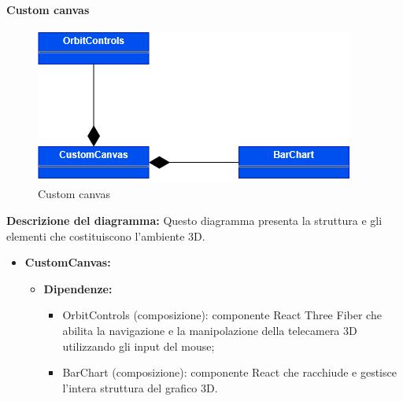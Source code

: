 \pagebreak

\paragraph{Custom canvas}
\begin{figure}[h!] \centering
    \includegraphics[scale=0.45]{template/images/uml_front/ui/customcanvas.png}
    \caption{Custom canvas}
\end{figure}
\textbf{Descrizione del diagramma:}
Questo diagramma presenta la struttura e gli elementi che costituiscono l'ambiente 3D.
\begin{itemize}
    \item \textbf{CustomCanvas:}
    \begin{itemize}
        \item \textbf{Dipendenze:}
        \begin{itemize}
            \item OrbitControls (composizione): componente React Three Fiber che abilita la navigazione e la manipolazione della telecamera 3D utilizzando gli input del mouse;
            \item BarChart (composizione): componente React che racchiude e gestisce l'intera struttura del grafico 3D.
        \end{itemize} 
    \end{itemize}
\end{itemize}

